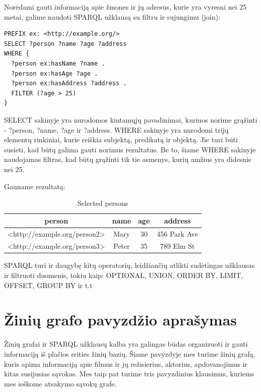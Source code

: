 \documentclass{VUMIFPSkursinis}
\begin{document}
Norėdami gauti informaciją apie žmones ir jų adresus, kurie yra vyresni nei 25 metai, galime naudoti SPARQL užklausą su filtru ir sujungimu (join):
\begin{lstlisting}[captionpos=b, caption=Informaciją apie žmones ir jų adresus, label=lst:sparql,
   basicstyle=\ttfamily,frame=single]
PREFIX ex: <http://example.org/>
SELECT ?person ?name ?age ?address
WHERE {
  ?person ex:hasName ?name .
  ?person ex:hasAge ?age .
  ?person ex:hasAddress ?address .
  FILTER (?age > 25)
}
\end{lstlisting}
\pagebreak
SELECT sakinyje yra nurodomos kintamųjų pavadinimai, kuriuos norime grąžinti - ?person, ?name, ?age ir ?address. WHERE sakinyje yra nurodomi trijų elementų rinkiniai, kurie reiškia subjektą, predikatą ir objektą. Jie turi būti susieti, kad būtų galima gauti norimus rezultatus. Be to, šiame WHERE sakinyje naudojamas filtras, kad būtų grąžinti tik tie asmenys, kurių amžius yra didesnis nei 25.

Gauname rezultatą:

\begin{table}[h]
\centering
\begin{tabular}{|c|c|c|c|}
\hline
person & name & age & address \\
\hline
<http://example.org/person2> & Mary & 30 & 456 Park Ave \\
<http://example.org/person3> & Peter & 35 & 789 Elm St \\
\hline
\end{tabular}
\caption{Selected persons}
\end{table}


SPARQL turi ir daugybę kitų operatorių, leidžiančių atlikti sudėtingas užklausas ir filtruoti duomenis, tokiu kaip: OPTIONAL, UNION, ORDER BY, LIMIT, OFFSET, GROUP BY ir t.t

\section{Žinių grafo pavyzdžio aprašymas}
Žinių grafai ir SPARQL užklausų kalba yra galingas būdas organizuoti ir gauti informaciją iš plačios srities žinių bazių. Šiame pavyzdyje mes turime žinių grafą, kuris apima informaciją apie filmus ir jų režisierius, aktorius, apdovanojimus ir kitas susijusias sąvokas. Mes taip pat turime tris pavyzdinius klausimus, kuriems mes ieškome atsakymo sąvokų grafe.
\end{document}
